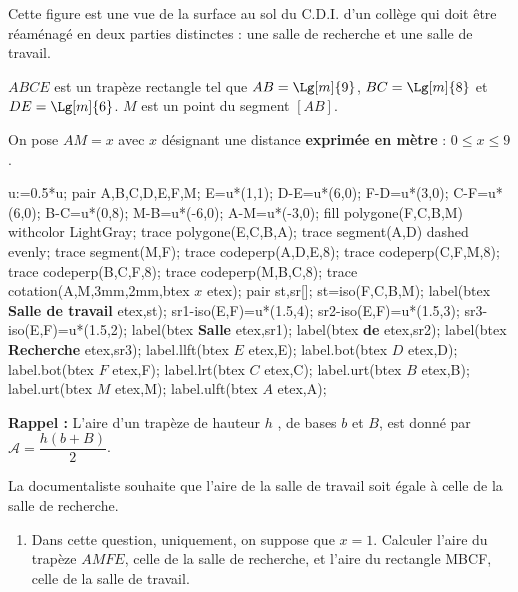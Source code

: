 \begin{corrige}
    Cette figure est une vue de la surface au sol du C.D.I. d'un collège qui doit être réaménagé
    en deux parties distinctes : une salle de recherche et une salle de travail.

    $ABCE$ est un trapèze rectangle tel que $AB=\Lg[m]{9}$, $BC=\Lg[m]{8}$ et $DE=\Lg[m]{6}$.
    $M$ est un point du segment $[AB]$. 
    
    On pose $AM=x$ avec $x$ désignant une distance \textbf{exprimée en mètre} : $0\leq x \leq 9$.

    \smallskip
    \hspace*{-5mm}
    \begin{Geometrie}[CoinHD={(17u,10u)}]
        u:=0.5*u;
        pair A,B,C,D,E,F,M;
        E=u*(1,1);
        D-E=u*(6,0);
        F-D=u*(3,0);
        C-F=u*(6,0);
        B-C=u*(0,8);
        M-B=u*(-6,0);
        A-M=u*(-3,0);
        fill polygone(F,C,B,M) withcolor LightGray;
        trace polygone(E,C,B,A);
        trace segment(A,D) dashed evenly;
        trace segment(M,F);
        trace codeperp(A,D,E,8);
        trace codeperp(C,F,M,8);
        trace codeperp(B,C,F,8);
        trace codeperp(M,B,C,8);
        trace cotation(A,M,3mm,2mm,btex $x$ etex);
        pair st,sr[];
        st=iso(F,C,B,M);
        label(btex \textbf{Salle de travail} etex,st);
        sr1-iso(E,F)=u*(1.5,4);
        sr2-iso(E,F)=u*(1.5,3);
        sr3-iso(E,F)=u*(1.5,2);
        label(btex \textbf{Salle} etex,sr1);
        label(btex \textbf{de} etex,sr2);
        label(btex \textbf{Recherche} etex,sr3);
        label.llft(btex $E$ etex,E);
        label.bot(btex  $D$ etex,D);
        label.bot(btex  $F$ etex,F);
        label.lrt(btex  $C$ etex,C);
        label.urt(btex  $B$ etex,B);
        label.urt(btex  $M$ etex,M);
        label.ulft(btex $A$ etex,A);
    \end{Geometrie}

    \textbf{Rappel :} L'aire d'un trapèze de hauteur $h$ , de bases $b$ et $B$, est donné par $\mathcal{A}=\dfrac{h(b+B)}{2}$.

    La documentaliste souhaite que l'aire de la salle de travail soit égale à celle de la salle de recherche.
    \begin{enumerate}
        \item Dans cette question, uniquement, on suppose que $x=1$. Calculer l'aire du trapèze $AMFE$, celle de la salle de
        recherche, et l'aire du rectangle MBCF, celle de la salle de travail.


\end{enumerate}
\end{corrige}
